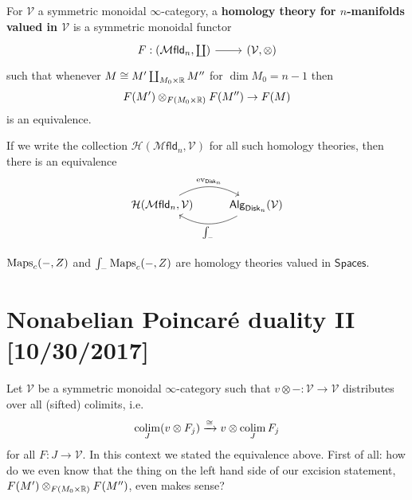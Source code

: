 \documentclass{amsart}
\DeclareMathOperator{\ev}{ev}
\newcommand{\disk}{\mathsf{Disk}_n}
\begin{document}
\begin{definition}
    For $\mathcal{V}$ a symmetric monoidal $\infty$-category, a \textbf{homology theory
        for $n$-manifolds valued in $\mathcal{V}$} is a symmetric monoidal functor
        \begin{equation*}
            \begin{tikzcd}
                F: (\mathcal{M}\mathsf{fld}_n,\coprod) \rar & (\mathcal{V},\otimes)
            \end{tikzcd}
        \end{equation*}
        such that whenever $M\cong M' \coprod_{M_0\times\mathbb{R}} M''$ for $\dim M_0=n-1$ then
        \begin{equation*}
            F(M')\otimes_{F(M_0\times\mathbb{R})}F(M'')\to F(M)
        \end{equation*}
        is an equivalence.
\end{definition}

\begin{theorem}
    If we write the collection $\mathcal{H}(\mathcal{M}\mathsf{fld}_n,\mathcal{V})$ for all such
    homology theories, then there is an equivalence
    \begin{equation*}
        \begin{tikzcd}
            \mathcal{H}(\mathcal{M}\mathsf{fld}_n, \mathcal{V}) \rar[bend left]{\ev_{\disk}} & \mathsf{Alg}_{\disk}(\mathcal{V})\lar[bend left]{\int_-}
        \end{tikzcd}
    \end{equation*}
\end{theorem}

\begin{theorem}
    $\operatorname{Maps}_c(-,Z)$ and $\int_- \operatorname{Maps}_c(-,Z)$ are homology theories valued in $\mathsf{Spaces}$.
\end{theorem}


\newpage

\section{Nonabelian Poincar\'e duality II [10/30/2017]}

Let $\mathcal{V}$ be a symmetric monoidal $\infty$-category such that $v\otimes -:\mathcal{V}\to \mathcal{V}$
distributes over all (sifted) colimits, i.e.
\begin{equation*}
    \operatorname*{colim}_J (v\otimes F_j)\xrightarrow{\cong}v\otimes\operatorname*{colim}_J F_j
\end{equation*}
for all $F:J\to \mathcal{V}$. In this context we stated the equivalence above.
First of all: how do we even know that the thing on the left hand side of our 
excision statement, $F(M')\otimes_{F(M_0\times\mathbb{R})}F(M'')$, even makes sense?
\end{document}
